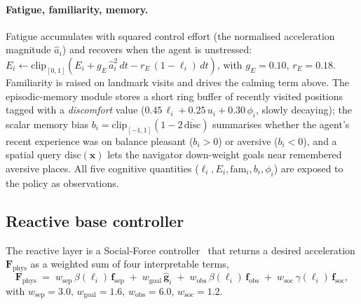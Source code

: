 \documentclass[sigconf,nonacm]{acmart}
\begin{document}
\paragraph{Fatigue, familiarity, memory.} Fatigue accumulates with squared control effort (the normalised acceleration magnitude $\hat{a}_i$) and recovers when the agent is unstressed: $E_i \leftarrow \mathrm{clip}_{[0,1]}(E_i + g_E\,\hat{a}_i^2\,dt - r_E\,(1-\ell_i)\,dt)$, with $g_E=0.10$, $r_E=0.18$. Familiarity is raised on landmark visits and drives the calming term above. The episodic-memory module stores a short ring buffer of recently visited positions tagged with a \emph{discomfort} value ($0.45\,\ell_i + 0.25\,u_i + 0.30\,\phi_i$, slowly decaying); the scalar memory bias $b_i = \mathrm{clip}_{[-1,1]}(1-2\,\overline{\mathrm{disc}})$ summarises whether the agent's recent experience was on balance pleasant ($b_i>0$) or aversive ($b_i<0$), and a spatial query $\mathrm{disc}(\mathbf{x})$ lets the navigator down-weight goals near remembered aversive places. All five cognitive quantities ($\ell_i,E_i,\mathrm{fam}_i,b_i,\phi_i$) are exposed to the policy as observations.

\subsection{Reactive base controller}
\label{sub:sfm}
The reactive layer is a Social-Force controller~\cite{helbing1995} that returns a desired acceleration $\mathbf{F}_{\mathrm{phys}}$ as a weighted sum of four interpretable terms,
\begin{equation}
\mathbf{F}_{\mathrm{phys}} \;=\; w_{\mathrm{sep}}\,\beta(\ell_i)\,\mathbf{f}_{\mathrm{sep}} \;+\; w_{\mathrm{goal}}\,\hat{\mathbf{g}}_i \;+\; w_{\mathrm{obs}}\,\beta(\ell_i)\,\mathbf{f}_{\mathrm{obs}} \;+\; w_{\mathrm{soc}}\,\gamma(\ell_i)\,\mathbf{f}_{\mathrm{soc}},
\label{eq:fphys}
\end{equation}
with $w_{\mathrm{sep}}=3.0,\,w_{\mathrm{goal}}=1.6,\,w_{\mathrm{obs}}=6.0,\,w_{\mathrm{soc}}=1.2$.
\end{document}
